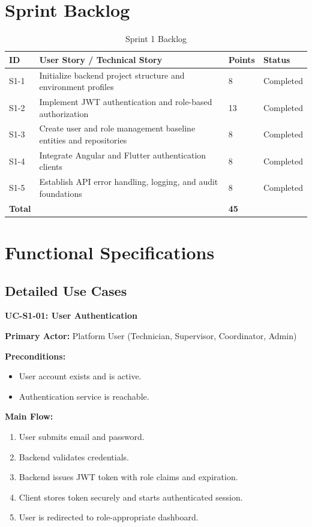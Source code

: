 \section{Sprint Backlog}

\begin{table}[H]
\centering
\caption{Sprint 1 Backlog}
\label{tab:sprint1_backlog}
\begin{tabularx}{\textwidth}{|l|X|l|l|}
\hline
\textbf{ID} & \textbf{User Story / Technical Story} & \textbf{Points} & \textbf{Status} \\
\hline
S1-1 & Initialize backend project structure and environment profiles & 8 & Completed \\
\hline
S1-2 & Implement JWT authentication and role-based authorization & 13 & Completed \\
\hline
S1-3 & Create user and role management baseline entities and repositories & 8 & Completed \\
\hline
S1-4 & Integrate Angular and Flutter authentication clients & 8 & Completed \\
\hline
S1-5 & Establish API error handling, logging, and audit foundations & 8 & Completed \\
\hline
\textbf{Total} & & \textbf{45} & \\
\hline
\end{tabularx}
\end{table}

\section{Functional Specifications}

\subsection{Detailed Use Cases}

\textbf{UC-S1-01: User Authentication}

\textbf{Primary Actor:} Platform User (Technician, Supervisor, Coordinator, Admin)

\textbf{Preconditions:}
\begin{itemize}
\item User account exists and is active.
\item Authentication service is reachable.
\end{itemize}

\textbf{Main Flow:}
\begin{enumerate}
\item User submits email and password.
\item Backend validates credentials.
\item Backend issues JWT token with role claims and expiration.
\item Client stores token securely and starts authenticated session.
\item User is redirected to role-appropriate dashboard.
\end{enumerate}

